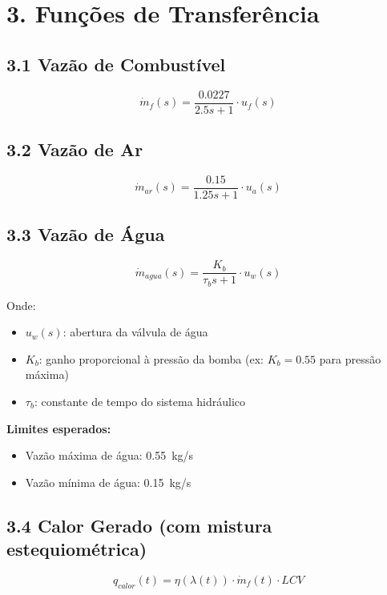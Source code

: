 \documentclass[12pt]{article}
\begin{document}
\section*{3. Fun\c{c}\~oes de Transfer\^encia}
\subsection*{3.1 Vaz\~ao de Combust\'ivel}
\begin{equation}
\dot{m}_f(s) = \frac{0.0227}{2.5s + 1} \cdot u_f(s)
\end{equation}

\subsection*{3.2 Vaz\~ao de Ar}
\begin{equation}
\dot{m}_{ar}(s) = \frac{0.15}{1.25s + 1} \cdot u_a(s)
\end{equation}

\subsection*{3.3 Vaz\~ao de \'Agua}
\begin{equation}
\dot{m}_{agua}(s) = \frac{K_b}{\tau_b s + 1} \cdot u_w(s)
\end{equation}

Onde:
\begin{itemize}
    \item \( u_w(s) \): abertura da v\'alvula de \'agua
    \item \( K_b \): ganho proporcional \`a press\~ao da bomba (ex: \( K_b = 0.55 \) para press\~ao m\'axima)
    \item \( \tau_b \): constante de tempo do sistema hidr\'aulico
\end{itemize}

\textbf{Limites esperados:}
\begin{itemize}
    \item Vaz\~ao m\'axima de \'agua: \SI{0.55}{kg/s}
    \item Vaz\~ao m\'inima de \'agua: \SI{0.15}{kg/s}
\end{itemize}

\subsection*{3.4 Calor Gerado (com mistura estequiom\'etrica)}
\begin{equation}
q_{calor}(t) = \eta(\lambda(t)) \cdot \dot{m}_f(t) \cdot LCV
\end{equation}
\end{document}
